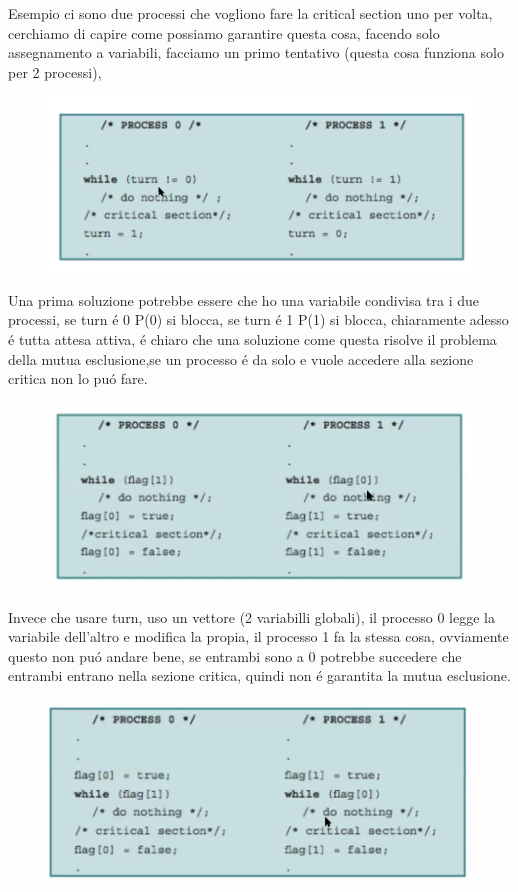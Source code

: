 Esempio ci sono due processi che vogliono fare la critical section uno per volta, cerchiamo di capire come
possiamo garantire questa cosa, facendo solo assegnamento a variabili, facciamo un primo tentativo (questa cosa funziona solo per 2 processi),
\begin{figure}[H]
    \centering
    \includegraphics[width=0.7\linewidth]{immagini/MutuaEsclusionePrimoTentativo}
\end{figure}
Una prima soluzione potrebbe essere che ho una variabile condivisa tra i due processi, se turn é 0 P(0) si blocca,
se turn é 1 P(1) si blocca, chiaramente adesso é tutta attesa attiva, é chiaro che una soluzione come questa risolve il
problema della mutua esclusione,se un processo é da solo e vuole accedere alla sezione critica non lo puó fare.

\begin{figure}[H]
    \centering
    \includegraphics[width=0.7\linewidth]{immagini/MutuaEsclusioneSecondoTentativo}
\end{figure}
Invece che usare turn, uso un vettore (2 variabilli globali), il processo 0 legge la variabile dell'altro e modifica
la propia, il processo 1 fa la stessa cosa, ovviamente questo non puó andare bene, se entrambi sono a 0 potrebbe succedere
che entrambi entrano nella sezione critica, quindi non é garantita la mutua esclusione.

\begin{figure}[H]
    \centering
    \includegraphics[width=0.7\linewidth]{immagini/MutuaEsclusioneTerzoTentativo}
\end{figure}


